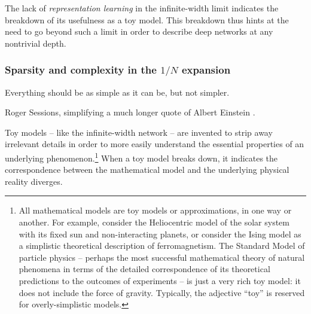\documentclass[12pt]{article}
\begin{document}
The lack of \emph{representation learning} in the infinite-width limit indicates the breakdown of its usefulness as a toy model. %
This breakdown thus hints at the need to go beyond such a limit in order 
to describe deep networks at any nontrivial depth.























\subsubsection*{Sparsity and complexity in the \texorpdfstring{$1/N$}{1/N} expansion}%
\epigraph{Everything should be as simple as it can be, but not simpler.}{Roger Sessions, simplifying a much longer quote of Albert Einstein  \cite{sessions_1950}.}


\noindent{}Toy models -- like the infinite-width network -- are invented to strip away irrelevant details in order to more easily understand the essential properties of an underlying phenomenon.\footnote{
All mathematical models are toy models or approximations, in one way or another. For example, consider the Heliocentric model of the solar system with its fixed sun and non-interacting planets, or consider the Ising model as a simplistic theoretical description of ferromagnetism. The Standard Model of particle physics \cite{Glashow:1961tr,Weinberg:1967tq,Salam:1968rm} -- perhaps the most successful mathematical theory of natural phenomena in terms of the detailed correspondence of its theoretical predictions to the outcomes of experiments -- is just a very rich toy model: 
it does not include the force of gravity.
Typically, the adjective ``toy'' is reserved for overly-simplistic models.
}
When a toy model breaks down, it indicates the correspondence between the mathematical model and the underlying physical reality diverges.
\end{document}
